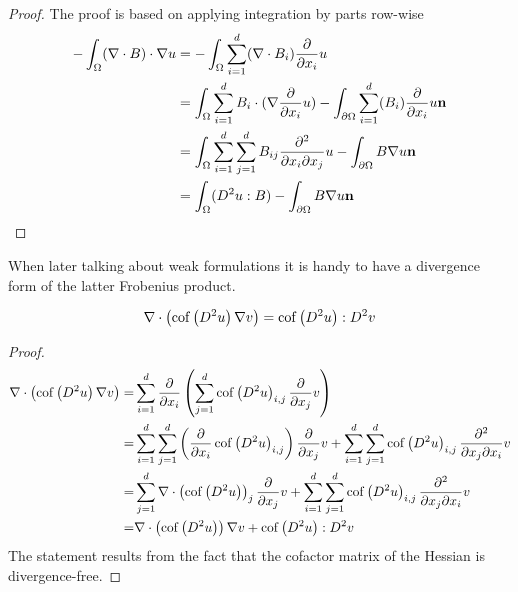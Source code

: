 \begin{proof}
The proof is based on applying integration by parts row-wise
\begin{align*}
- \int_\Omega (\nabla \cdot B) \cdot \nabla u &= 
- \int_\Omega \sum_{i = 1}^{d} (\nabla \cdot B_i) \frac \partial {\partial x_i} u \\
&=  \int_\Omega \sum_{i = 1}^{d} B_i \cdot  (\nabla \frac \partial {\partial x_i} u) - \int_{\partial \Omega} \sum_{i = 1}^{d} (B_i) \frac \partial {\partial x_i} u \mathbf{n} \\
&=  \int_\Omega \sum_{i = 1}^{d}\sum_{j= 1}^{d} B_{ij} \frac {\partial^2} {\partial x_i\partial x_j} u- \int_{\partial \Omega} B \nabla u \mathbf{n} \\
&=  \int_\Omega (D^2 u : B)- \int_{\partial \Omega} B \nabla u \mathbf{n} 
\end{align*}
\end{proof}

When later talking about weak formulations it is handy to have a divergence form of the latter Frobenius product.
\begin{lemma} \label{la: An application of the divergernce product rule}
\[
		\nabla \cdot \left( \mycof {D^2 u } \nabla v \right) %
		= \mycof {D^2 u}: D^2 v
\] 
\end{lemma}

\begin{proof}
\begin{align*}
\nabla \cdot \left( \mycof {D^2 u } \nabla v \right) =&%
\sum_{i= 1}^{d} \dx {x_i} 	\left( \sum_{j= 1}^{d} \mycof {D^2 u }_{i,j} \dx{x_j} v \right)\\
=&  \sum_{i= 1}^{d} \sum_{j= 1}^{d}  \left(\dx {x_i} \mycof {D^2 u }_{i,j}  \right) \dx{x_j}v + \sum_{i= 1}^{d} \sum_{j= 1}^{d}  \mycof {D^2 u }_{i,j} \dxy{x_j}{x_i}v\\
=&  \sum_{j= 1}^{d}  \nabla \cdot \left(\mycof {D^2 u }\right)_j \dx{x_j}v + \sum_{i= 1}^{d} \sum_{j= 1}^{d}  \mycof {D^2 u }_{i,j} \dxy{x_j}{x_i}v\\
=&   \nabla \cdot \left(\mycof {D^2 u }\right) \nabla v+ \mycof {D^2 u }:D^2v
\end{align*}
The statement results from the fact that the cofactor matrix of the Hessian is divergence-free.
\end{proof}
